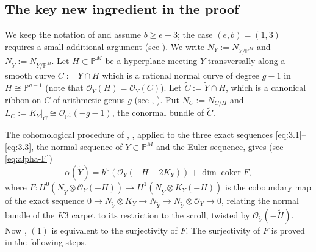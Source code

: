 \documentclass[11pt,twoside]{amsart}
\theoremstyle{plain}
\theoremstyle{definition}
\newcommand{\PP}{\mathbb{P}}
\newcommand{\PM}{\mathbb{P}^M}
\newcommand{\OO}{\mathcal{O}}
\newcommand{\coker}{\operatorname{coker}}
\newcommand{\Yt}{\widetilde{Y}}
\newcommand{\Ht}{\widetilde{H}}
\newcommand{\Ct}{\widetilde{C}}
\newcommand{\NY}{N_{Y}}
\newcommand{\NYt}{N_{\Yt}}
\begin{document}

\subsection{The key new ingredient in the proof}\label{subsec:intro-ingredient}

We keep the notation of  and assume $b \geq e+3$; the case $(e,b) = (1,3)$ requires a small additional argument (see ). We write $\NY := N_{Y/\PM}$ and $\NYt := N_{\Yt/\PM}$. Let $H \subset \PM$ be a hyperplane meeting $Y$ transversally along a smooth curve $C := Y \cap H$ which is a rational normal curve of degree $g-1$ in $H \cong \PP^{g-1}$ (note that $\OO_Y(H) = \OO_Y(C)$). Let $\Ct := \Yt \cap H$, which is a canonical ribbon on $C$ of arithmetic genus $g$ (see \cite{BE95}, \cite{GP97}). Put $N_C := N_{C/H}$ and $L_C := K_Y|_C \cong \OO_{\PP^1}(-g-1)$, the conormal bundle of $\Ct$.

\smallskip

The cohomological procedure of \cite{BM24}, \cite{BM25}, applied to the three exact sequences \eqref{eq:3.1}--\eqref{eq:3.3}, the normal sequence of $Y \subset \PM$ and the Euler sequence, gives (see \eqref{eq:alpha-F})
\[
\alpha(\Yt) = h^0(\OO_Y(-H-2K_Y))+\dim\coker F,
\]
where $F\colon H^0(\NYt\otimes\OO_Y(-H)) \to H^1(\NYt\otimes K_Y(-H))$ is the coboundary map of the exact sequence $0 \to \NYt\otimes K_Y \to \NYt \to \NYt\otimes\OO_Y \to 0$, relating the normal bundle of the $K3$ carpet to its restriction to the scroll, twisted by $\OO_{\Yt}(-\Ht)$. 
Now , $(1)$ is equivalent to the surjectivity of $F$. The surjectivity of $F$ is proved in the following steps.
\end{document}
